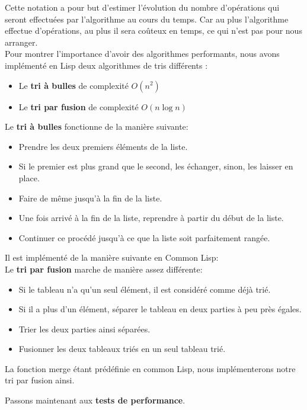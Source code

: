 \documentclass[a4paper, 12pt]{article}
\numberwithin{equation}{subsection}
\begin{document}
Cette notation a pour but d'estimer l'évolution du nombre d'opérations qui seront effectuées par l'algorithme au cours du temps. Car au plus l'algorithme effectue d'opérations, au plus il sera coûteux en temps, ce qui n'est pas pour nous arranger. \\

Pour montrer l'importance d'avoir des algorithmes performants, nous avons implémenté en Lisp deux algorithmes de tris différents : \\[0.2cm]
\begin{itemize}
  \item Le {\bf tri à bulles} de complexité {\bf $O(n^{2})$}
  \item Le {\bf tri par fusion} de complexité {\bf $O(n\log{n})$}\\
\end{itemize}
Le {\bf tri à bulles} fonctionne de la manière suivante:
\begin{itemize}
  \item Prendre les deux premiers éléments de la liste.
  \item Si le premier est plus grand que le second, les échanger, sinon, les laisser en place.
  \item Faire de même jusqu'à la fin de la liste.
  \item Une fois arrivé à la fin de la liste, reprendre à partir du début de la liste.
  \item Continuer ce procédé jusqu'à ce que la liste soit parfaitement rangée.\\[0.2cm]
\end{itemize}
Il est implémenté de la manière suivante en Common Lisp: \\[0.2cm]

Le {\bf tri par fusion} marche de manière assez différente:
\begin{itemize}
  \item Si le tableau n'a qu'un seul élément, il est considéré comme déjà trié.
  \item Si il a plus d'un élément, séparer le tableau en deux parties à peu près égales.
  \item Trier les deux parties ainsi séparées.
  \item Fusionner les deux tableaux triés en un seul tableau trié. \\[0.2cm]
\end{itemize}
La fonction merge étant prédéfinie en common Lisp, nous implémenterons notre tri par fusion ainsi.

Passons maintenant aux {\bf tests de performance}. \\
\end{document}
